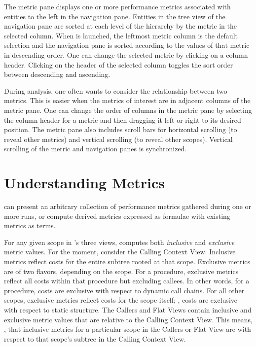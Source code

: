 The metric pane displays one or more performance metrics associated with entities to the left in the navigation pane.
Entities in the tree view of the navigation pane are sorted at each level of the hierarchy by the metric in the selected column.
When \hpcviewer{} is launched, the leftmost metric column is the default selection and the navigation pane is sorted according to the values of that metric in descending order.
One can change the selected metric by clicking on a column header.
Clicking on the header of the selected column toggles the sort order between descending and ascending.

During analysis, one often wants to consider the relationship between two metrics.
This is easier when the metrics of interest are in adjacent columns of the metric pane.
One can change the order of columns in the metric pane by selecting the column header for a metric and then dragging it left or right to its desired position.
The metric pane also includes scroll bars for horizontal scrolling (to reveal other metrics) and vertical scrolling (to reveal other scopes).
Vertical scrolling of the metric and navigation panes is synchronized.



\section{Understanding Metrics}

\hpcviewer{} can present an arbitrary collection of performance metrics gathered during one or more runs, or compute derived metrics expressed as formulae with existing metrics as terms.

For any given scope in \hpcviewer{}'s three views, \hpcviewer{} computes both \emph{inclusive} and \emph{exclusive} metric values.
For the moment, consider the Calling Context View.
Inclusive metrics reflect costs for the entire subtree rooted at that scope.
Exclusive metrics are of two flavors, depending on the scope.
For a procedure, exclusive metrics reflect all costs within that procedure but excluding callees.
In other words, for a procedure, costs are exclusive with respect to dynamic call chains.
For all other scopes, exclusive metrics reflect costs for the scope itself; \ie{}, costs are exclusive with respect to static structure.
The Callers and Flat Views contain inclusive and exclusive metric values that are relative to the Calling Context View.
This means, \eg{}, that inclusive metrics for a particular scope in the Callers or Flat View are with respect to that scope's subtree in the Calling Context View.


